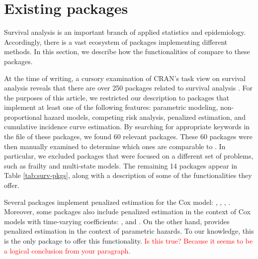 \documentclass[
]{jss}
\begin{document}
\hypertarget{existing-packages}{%
\section{Existing packages}\label{existing-packages}}

Survival analysis is an important branch of applied statistics and
epidemiology. Accordingly, there is a vast ecosystem of 
packages implementing different methods. In this section, we describe
how the functionalities of  compare to these packages.

At the time of writing, a cursory examination of CRAN's task view on
survival analysis reveals that there are over 250 packages related to
survival analysis \citeyearpar{survTaskView}. For the purposes of this
article, we restricted our description to packages that implement at
least one of the following features: parametric modeling,
non-proportional hazard models, competing risk analysis, penalized
estimation, and cumulative incidence curve estimation. By searching for
appropriate keywords in the  file of these packages,
we found 60 relevant packages. These 60 packages were then manually
examined to determine which ones are comparable to . In
particular, we excluded packages that were focused on a different set of
problems, such as frailty and multi-state models. The remaining 14
packages appear in Table \ref{tab:surv-pkgs}, along with a description
of some of the functionalities they offer.

Several packages implement penalized estimation for the Cox model:
 \citeyearpar{regpathcox}, 
\citeyearpar{park_hastie},  \citeyearpar{l1penal},
 \citeyearpar{gerds_blanche}. Moreover, some
packages also include penalized estimation in the context of Cox models
with time-varying coefficients: 
\citeyearpar{perperoglou},  \citeyearpar{clements_liu} and
 \citeyearpar{survival-package}. On the other hand,
 provides penalized estimation in the context of
parametric hazards. To our knowledge, this is the only package to offer
this functionality.
\textcolor{red}{Is this true? Because it seems to be a logical conclusion from your paragraph.}
\end{document}
